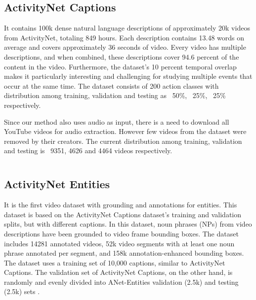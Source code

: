 \subsection{ActivityNet Captions}

\par It contains 100k dense natural language descriptions of approximately 20k videos from ActivityNet, totaling 849 hours. Each description contains 13.48 words on average and covers approximately 36 seconds of video. Every video has multiple descriptions, and when combined, these descriptions cover 94.6 percent of the content in the video. Furthermore, the dataset's 10 percent temporal overlap makes it particularly interesting and challenging for studying multiple events that occur at the same time. The dataset consists of 200 action classes with distribution among training, validation and testing as ~50\%, ~25\%, ~25\% respectively.   \cite{krishna2017densecaptioning}
\par Since our method also uses audio as input, there is a need to download all YouTube videos for audio extraction. However few videos from the dataset were removed by their creators. The current distribution among training, validation and testing is ~9351, 4626 and 4464 videos respectively.


\inputminted[frame=lines,framesep=2mm,baselinestretch=1.2,label={Format of ActivityNet Captions dataset},labelposition=bottomline]{javascript}{assets/code/anet-captions.json}



\subsection{ActivityNet Entities}

\par It is the first video dataset with grounding and annotations for entities. This dataset is based on the ActivityNet Captions dataset's training and validation splits, but with different captions. In this dataset, noun phrases (NPs) from video descriptions have been grounded to video frame bounding boxes. The dataset includes 14281 annotated videos, 52k video segments with at least one noun phrase annotated per segment, and 158k annotation-enhanced bounding boxes. The dataset uses a training set of 10,000 captions, similar to ActivityNet Captions. The validation set of ActivityNet Captions, on the other hand, is randomly and evenly divided into ANet-Entities validation (2.5k) and testing (2.5k) sets \cite{zhou2018grounded}.




